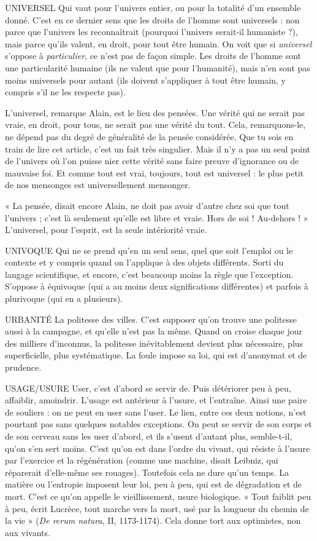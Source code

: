 UNIVERSEL Qui vaut pour l’univers entier, ou pour la totalité d’un
ensemble donné. C’est en ce dernier sens que les droits de
l’homme sont universels : non parce que l’univers les reconnaîtrait (pourquoi
l'univers serait-il humaniste ?), mais parce qu’ils valent, en droit, pour tout être
humain. On voit que si {\it universel} s'oppose à {\it particulier}, ce n’est pas de façon
simple. Les droits de l’homme sont une particularité humaine (ils ne valent que
pour l'humanité), mais n’en sont pas moins universels pour autant (ils doivent
s'appliquer à tout être humain, y compris s’il ne les respecte pas).

L’universel, remarque Alain, est le lieu des pensées. Une vérité qui ne
serait pas vraie, en droit, pour tous, ne serait pas une vérité du tout. Cela,
remarquons-le, ne dépend pas du degré de généralité de la pensée considérée.
Que tu sois en train de lire cet article, c’est un fait très singulier. Mais
il n’y a pas un seul point de l’univers où l’on puisse nier cette vérité sans
faire preuve d’ignorance ou de mauvaise foi. Et comme tout est vrai, toujours,
tout est universel : le plus petit de nos mensonges est universellement
mensonger.

« La pensée, disait encore Alain, ne doit pas avoir d’autre chez soi que tout
l'univers ; c’est là seulement qu’elle est libre et vraie. Hors de soi ! Au-dehors ! »
L’universel, pour l’esprit, est la seule intériorité vraie.

UNIVOQUE Qui ne se prend qu’en un seul sens, quel que soit l'emploi ou
le contexte et y compris quand on l’applique à des objets différents.
Sorti du langage scientifique, et encore, c’est beaucoup moins la règle
que l’exception. S’oppose à équivoque (qui a au moins deux significations différentes)
et parfois à plurivoque (qui en a plusieurs).

URBANITÉ La politesse des villes. C’est supposer qu’on trouve une politesse
aussi à la campagne, et qu’elle n’est pas la même. Quand
on croise chaque jour des milliers d’inconnus, la politesse inévitablement
devient plus nécessaire, plus superficielle, plus systématique. La foule impose sa
loi, qui est d’anonymat et de prudence.

USAGE/USURE User, c’est d’abord se servir de. Puis détériorer peu à peu,
affaiblir, amoindrir. L'usage est antérieur à l’usure, et l’entraîne.
Ainsi une paire de souliers : on ne peut en user sans l’user. Le lien, entre
ces deux notions, n’est pourtant pas sans quelques notables exceptions. On
peut se servir de son corps et de son cerveau sans les user d’abord, et ils s’usent
d'autant plus, semble-t-il, qu’on s’en sert moins. C’est qu’on est dans l’ordre du
vivant, qui résiste à l’usure par l’exercice et la régénération (comme une
machine, disait Leibniz, qui réparerait d’elle-même ses rouages). Toutefois cela
ne dure qu’un temps. La matière ou l’entropie imposent leur loi, peu à peu, qui
est de dégradation et de mort. C’est ce qu’on appelle le vieillissement, usure
biologique. « Tout faiblit peu à peu, écrit Lucrèce, tout marche vers la mort,
usé par la longueur du chemin de la vie » ({\it De rerum natura}, II, 1173-1174).
Cela donne tort aux optimistes, non aux vivants.

